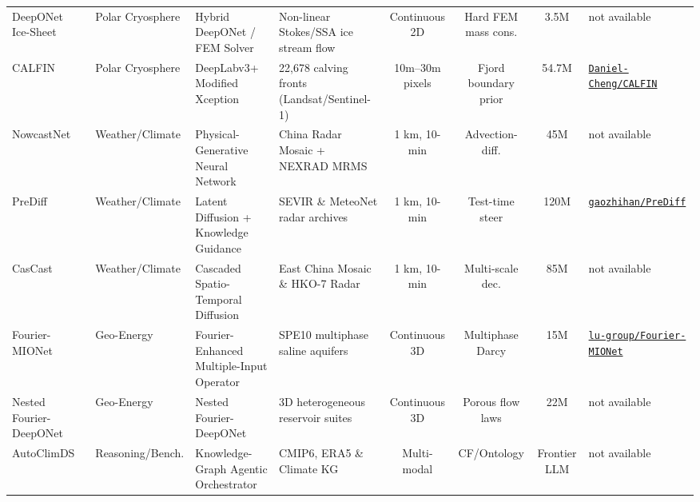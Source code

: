 \begin{table}[t]
{\begin{tabular}{@{}lp{2.0cm}p{3.0cm}p{3.4cm}cccp{3.0cm}@{}}
DeepONet Ice-Sheet~\cite{he2023hybrid} & Polar Cryosphere & Hybrid DeepONet / FEM Solver & Non-linear Stokes/SSA ice stream flow & Continuous 2D & Hard FEM mass cons. & 3.5M & not available \\
CALFIN~\cite{cheng2021calfin} & Polar Cryosphere & DeepLabv3+ Modified Xception & 22,678 calving fronts (Landsat/Sentinel-1) & 10m--30m pixels & Fjord boundary prior & 54.7M & \href{https://github.com/Daniel-Cheng/CALFIN}{\texttt{Daniel-Cheng/CALFIN}} \\
NowcastNet~\cite{zhang2023nowcastnet} & Weather/Climate & Physical-Generative Neural Network & China Radar Mosaic + NEXRAD MRMS & 1 km, 10-min & Advection-diff. & 45M & not available \\
PreDiff~\cite{gao2023prediff} & Weather/Climate & Latent Diffusion + Knowledge Guidance & SEVIR \& MeteoNet radar archives & 1 km, 10-min & Test-time steer & 120M & \href{https://github.com/gaozhihan/PreDiff}{\texttt{gaozhihan/PreDiff}} \\
CasCast~\cite{gong2024cascast} & Weather/Climate & Cascaded Spatio-Temporal Diffusion & East China Mosaic \& HKO-7 Radar & 1 km, 10-min & Multi-scale dec. & 85M & not available \\
Fourier-MIONet~\cite{jiang2024fouriermionet} & Geo-Energy & Fourier-Enhanced Multiple-Input Operator & SPE10 multiphase saline aquifers & Continuous 3D & Multiphase Darcy & 15M & \href{https://github.com/lu-group/Fourier-MIONet}{\texttt{lu-group/Fourier-MIONet}} \\
Nested Fourier-DeepONet~\cite{lee2024nested} & Geo-Energy & Nested Fourier-DeepONet & 3D heterogeneous reservoir suites & Continuous 3D & Porous flow laws & 22M & not available \\
AutoClimDS~\cite{jaber2025autoclimds} & Reasoning/Bench. & Knowledge-Graph Agentic Orchestrator & CMIP6, ERA5 \& Climate KG & Multi-modal & CF/Ontology & Frontier LLM & not available \\
\bottomrule
\end{tabular}%
}
\end{table}

